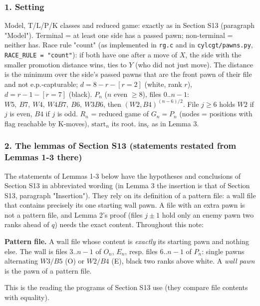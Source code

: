 \subsubsection*{1. Setting}
Model, T/L/P/K classes and reduced game: exactly as in Section S13 (paragraph "Model"). Terminal = at least one side has a passed pawn; non-terminal = neither has. Race rule "count" (as implemented in \texttt{rg.c} and in \texttt{cylcgt/pawns.py}, \texttt{RACE\_RULE = "count"}): if both have one after a move of $X$, the side with the smaller promotion distance wins, ties to $Y$ (who did not just move). The distance is the minimum over the side's passed pawns that are the front pawn of their file and not e.p.-capturable; $d=8-r-[r=2]$ (white, rank $r$), $d=r-1-[r=7]$ (black). $P_n$ ($n$ even $\ge8$), files $0..n-1$: $W5,\ B7,\ W4,\ W4B7,\ B6,\ W3B6$, then $(W2,B4)^{(n-6)/2}$. File $j\ge6$ holds $W2$ if $j$ is even, $B4$ if $j$ is odd. $R_n$ = reduced game of $G_n=P_n$ (nodes = positions with flag reachable by K-moves), $\mathrm{start}_n$ its root. $\mathrm{ins}_c$ as in Lemma 3.

\subsubsection*{2. The lemmas of Section S13 (statements restated from Lemmas 1-3 there)}
The statements of Lemmas 1-3 below have the hypotheses and conclusions of Section S13 in abbreviated wording (in Lemma 3 the insertion is that of Section S13, paragraph "Insertion"). They rely on its definition of a pattern file: a wall file that contains precisely its one starting wall pawn. A file with an extra pawn is not a pattern file, and Lemma 2's proof (files $j\pm1$ hold only an enemy pawn two ranks ahead of $q$) needs the exact content. Throughout this note:

\textbf{Pattern file.} A wall file whose content is \emph{exactly} its starting pawn and nothing else. The wall is files $3..n-1$ of $O_n$, $E_n$, resp. files $6..n-1$ of $P_n$: single pawns alternating $W3/B5$ (O) or $W2/B4$ (E), black two ranks above white. A \emph{wall pawn} is the pawn of a pattern file.

This is the reading the programs of Section S13 use (they compare file contents with equality).

